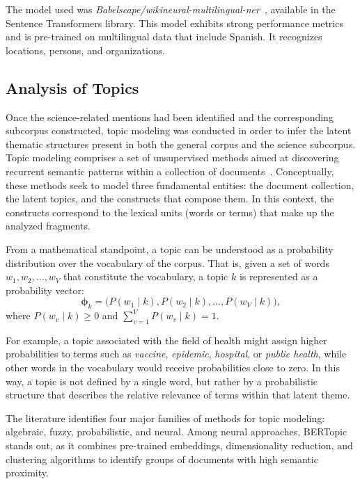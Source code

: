 \documentclass[pdflatex,sn-mathphys-num, iicol]{sn-jnl}
\begin{document}
	The model used was \textit{Babelscape/wikineural-multilingual-ner}~\cite{tedeschi-etal-2021-wikineural-combined}, available in the Sentence Transformers library. This model exhibits strong performance metrics and is pre-trained on multilingual data that include Spanish. It recognizes locations, persons, and organizations.
	
	\subsection{Analysis of Topics}\label{subsec:topics}
	
	Once the science-related mentions had been identified and the corresponding subcorpus constructed, topic modeling was conducted in order to infer the latent thematic structures present in both the general corpus and the science subcorpus. Topic modeling comprises a set of unsupervised methods aimed at discovering recurrent semantic patterns within a collection of documents~\cite{Abdelrazek2023}. Conceptually, these methods seek to model three fundamental entities: the document collection, the latent topics, and the constructs that compose them. In this context, the constructs correspond to the lexical units (words or terms) that make up the analyzed fragments.
	
	From a mathematical standpoint, a topic can be understood as a probability distribution over the vocabulary of the corpus. That is, given a set of words $w_1, w_2, \dots, w_V$ that constitute the vocabulary, a topic $k$ is represented as a probability vector:
	\[
	\boldsymbol{\phi}_k = \bigl( P(w_1 \mid k), P(w_2 \mid k), \dots, P(w_V \mid k) \bigr),
	\]
	where $P(w_v \mid k) \ge 0$ and $\sum_{v=1}^{V} P(w_v \mid k) = 1$.
	
	For example, a topic associated with the field of health might assign higher probabilities to terms such as \textit{vaccine}, \textit{epidemic}, \textit{hospital}, or \textit{public health}, while other words in the vocabulary would receive probabilities close to zero. In this way, a topic is not defined by a single word, but rather by a probabilistic structure that describes the relative relevance of terms within that latent theme.
	
	The literature identifies four major families of methods for topic modeling: algebraic, fuzzy, probabilistic, and neural. Among neural approaches, BERTopic~\cite{Grootendorst2022} stands out, as it combines pre-trained embeddings, dimensionality reduction, and clustering algorithms to identify groups of documents with high semantic proximity.
	
\end{document}
